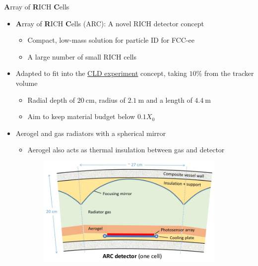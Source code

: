 \documentclass{beamer}
\begin{document}
\begin{frame}{\textbf{A}rray of \textbf{R}ICH \textbf{C}ells}
  \begin{itemize}
    \setlength\itemsep{0.2em}
    \item{\textbf{A}rray of \textbf{R}ICH \textbf{C}ells (ARC): A novel RICH detector concept}
    \begin{itemize}
      \item{Compact, low-mass solution for particle ID for FCC-ee}
      \item{A large number of small RICH cells}
    \end{itemize}
    \item{Adapted to fit into the \href{https://arxiv.org/abs/1911.12230}{CLD experiment} concept, taking $10\%$ from the tracker volume}
    \begin{itemize}
      \item{Radial depth of $\SI{20}{\centi\meter}$, radius of $\SI{2.1}{\meter}$ and a length of $\SI{4.4}{\meter}$}
      \item{Aim to keep material budget below $0.1X_0$}
    \end{itemize}
    \item{Aerogel and gas radiators with a spherical mirror}
    \begin{itemize}
      \item{Aerogel also acts as thermal insulation between gas and detector}
    \end{itemize}
  \end{itemize}
  \begin{figure}
    \centering
    \begin{subfigure}{0.4\textwidth}
      \includegraphics[width = 1.0\textwidth]{Plots/ARC_Cell.png}
    \end{subfigure}%

\end{figure}
\end{frame}
\end{document}
